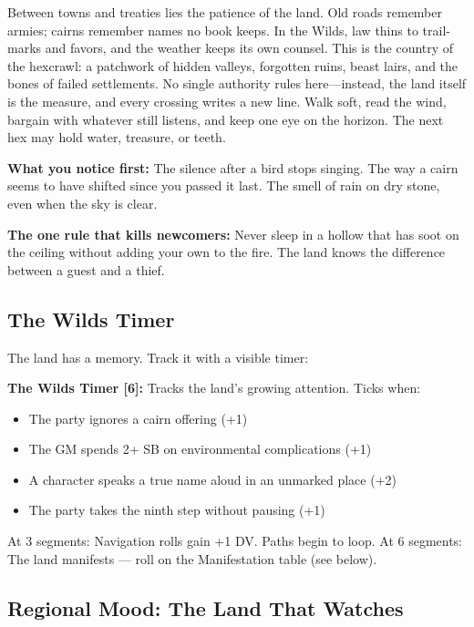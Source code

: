 \vspace{2mm}
\begin{tcolorbox}[colback=black!3,colframe=blue!60!black,title={Theme \& Atmosphere},breakable]
Between towns and treaties lies the patience of the land. Old roads remember armies; cairns remember names no book keeps. In the Wilds, law thins to trail-marks and favors, and the weather keeps its own counsel. This is the country of the hexcrawl: a patchwork of hidden valleys, forgotten ruins, beast lairs, and the bones of failed settlements. No single authority rules here---instead, the land itself is the measure, and every crossing writes a new line. Walk soft, read the wind, bargain with whatever still listens, and keep one eye on the horizon. The next hex may hold water, treasure, or teeth.

\vspace{2mm}
\textbf{What you notice first:} The silence after a bird stops singing. The way a cairn seems to have shifted since you passed it last. The smell of rain on dry stone, even when the sky is clear.

\textbf{The one rule that kills newcomers:} Never sleep in a hollow that has soot on the ceiling without adding your own to the fire. The land knows the difference between a guest and a thief.
\end{tcolorbox}

\subsection*{The Wilds Timer}
\label{sec:wilds-timer}

The land has a memory. Track it with a visible timer:

\textbf{The Wilds Timer [6]:} Tracks the land's growing attention. Ticks when:
\begin{itemize}
\item The party ignores a cairn offering (+1)
\item The GM spends 2+ SB on environmental complications (+1)
\item A character speaks a true name aloud in an unmarked place (+2)
\item The party takes the ninth step without pausing (+1)
\end{itemize}

At 3 segments: Navigation rolls gain +1 DV. Paths begin to loop.
At 6 segments: The land manifests --- roll on the Manifestation table (see below).

\subsection*{Regional Mood: The Land That Watches}

